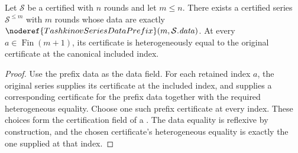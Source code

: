 \begin{lemma}
Let \(\mathcal S\) be a certified  with \(n\) rounds
and let \(m\leq n\).  There exists a certified series \(\mathcal S^{\leq m}\)
with \(m\) rounds whose data are exactly
\(\noderef{TashkinovSeriesDataPrefix}(m,\mathcal S.\mathit{data})\).
At every \(a\in\operatorname{Fin}(m+1)\), its certificate is heterogeneously
equal to the original certificate at the canonical included index.
\end{lemma}
\begin{proof}
Use the prefix data as the data field.  For each retained index \(a\), the
original series supplies its certificate at the included index, and
 supplies a corresponding certificate for
the prefix data together with the required heterogeneous equality.  Choose
one such prefix certificate at every index.  These choices form the
certification field of a .  The data equality is
reflexive by construction, and the chosen certificate's heterogeneous
equality is exactly the one supplied at that index.
\end{proof}
